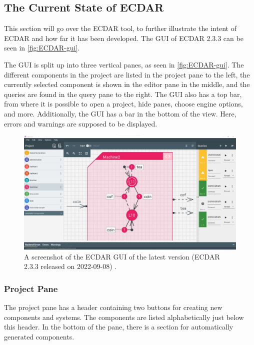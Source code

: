 \subsection{The Current State of ECDAR}\label{sub:the-current-state-of-ecdar} %
This section will go over the ECDAR tool, to further illustrate the intent of ECDAR and how far it has been developed. The GUI of ECDAR 2.3.3 can be seen in \autoref{fig:ECDAR-gui}.

The GUI is split up into three vertical panes, as seen in \autoref{fig:ECDAR-gui}. The different components in the project are listed in the project pane to the left, the currently selected component is shown in the editor pane in the middle, and the queries are found in the query pane to the right.
The GUI also has a top bar, from where it is possible to open a project, hide panes, choose engine options, and more.  
Additionally, the GUI has a bar in the bottom of the view. Here, errors and warnings are supposed to be displayed.

\begin{figure}[H]
    \centering
    \includegraphics[width=1\textwidth]{common/figures/ecdar-overview.jpg}
    \caption{A screenshot of the ECDAR GUI of the latest version (ECDAR 2.3.3 released on 2022-09-08) \cite{ECDARNETreleasenotes}.}
    \label{fig:ECDAR-gui}
\end{figure}

\subsubsection{Project Pane}
The project pane has a header containing two buttons for creating new components and systems. The components are listed alphabetically just below this header. 
In the bottom of the pane, there is a section for automatically generated components.

